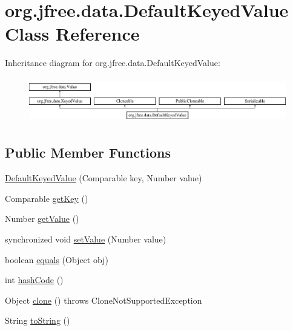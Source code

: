 \hypertarget{classorg_1_1jfree_1_1data_1_1_default_keyed_value}{}\section{org.\+jfree.\+data.\+Default\+Keyed\+Value Class Reference}
\label{classorg_1_1jfree_1_1data_1_1_default_keyed_value}
Inheritance diagram for org.\+jfree.\+data.\+Default\+Keyed\+Value\+:\begin{figure}[H]
\begin{center}
\leavevmode
\includegraphics[height=2.000000cm]{classorg_1_1jfree_1_1data_1_1_default_keyed_value}
\end{center}
\end{figure}
\subsection*{Public Member Functions}
\begin{DoxyCompactItemize}
\item 
\mbox{\hyperlink{classorg_1_1jfree_1_1data_1_1_default_keyed_value_a4d1c15cdefc96a23989aafceb6be411e}{Default\+Keyed\+Value}} (Comparable key, Number value)
\item 
Comparable \mbox{\hyperlink{classorg_1_1jfree_1_1data_1_1_default_keyed_value_a5f0bfcf7b9c134922523b70e19bb69ee}{get\+Key}} ()
\item 
Number \mbox{\hyperlink{classorg_1_1jfree_1_1data_1_1_default_keyed_value_a2eaff5e8eea89cc853a97b60aa4d3966}{get\+Value}} ()
\item 
synchronized void \mbox{\hyperlink{classorg_1_1jfree_1_1data_1_1_default_keyed_value_aff39dcaceec4386ef50fb16e5e6d8856}{set\+Value}} (Number value)
\item 
boolean \mbox{\hyperlink{classorg_1_1jfree_1_1data_1_1_default_keyed_value_a880ac178b54b7bd6b083d303c063e7cb}{equals}} (Object obj)
\item 
int \mbox{\hyperlink{classorg_1_1jfree_1_1data_1_1_default_keyed_value_ac4a182b187904ab16773e57134156001}{hash\+Code}} ()
\item 
Object \mbox{\hyperlink{classorg_1_1jfree_1_1data_1_1_default_keyed_value_a8eeabccd61ddd6609615e31d50422b64}{clone}} ()  throws Clone\+Not\+Supported\+Exception 
\item 
String \mbox{\hyperlink{classorg_1_1jfree_1_1data_1_1_default_keyed_value_adcfb1d3adfffaf084ee5d6718ad4e609}{to\+String}} ()
\end{DoxyCompactItemize}


